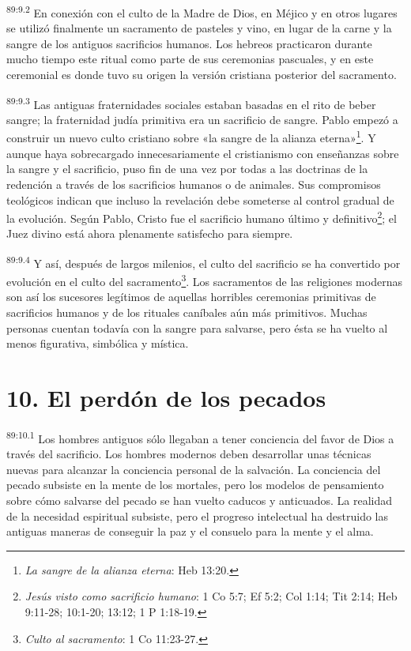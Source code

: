 \par
\textsuperscript{89:9.2} En conexión con el culto de la Madre de Dios, en Méjico y en otros lugares se utilizó finalmente un sacramento de pasteles y vino, en lugar de la carne y la sangre de los antiguos sacrificios humanos. Los hebreos practicaron durante mucho tiempo este ritual como parte de sus ceremonias pascuales, y en este ceremonial es donde tuvo su origen la versión cristiana posterior del sacramento.

\par
\textsuperscript{89:9.3} Las antiguas fraternidades sociales estaban basadas en el rito de beber sangre; la fraternidad judía primitiva era un sacrificio de sangre. Pablo empezó a construir un nuevo culto cristiano sobre «la sangre de la alianza eterna»\footnote{\textit{La sangre de la alianza eterna}: Heb 13:20.}. Y aunque haya sobrecargado innecesariamente el cristianismo con enseñanzas sobre la sangre y el sacrificio, puso fin de una vez por todas a las doctrinas de la redención a través de los sacrificios humanos o de animales. Sus compromisos teológicos indican que incluso la revelación debe someterse al control gradual de la evolución. Según Pablo, Cristo fue el sacrificio humano último y definitivo\footnote{\textit{Jesús visto como sacrificio humano}: 1 Co 5:7; Ef 5:2; Col 1:14; Tit 2:14; Heb 9:11-28; 10:1-20; 13:12; 1 P 1:18-19.}; el Juez divino está ahora plenamente satisfecho para siempre.

\par
\textsuperscript{89:9.4} Y así, después de largos milenios, el culto del sacrificio se ha convertido por evolución en el culto del sacramento\footnote{\textit{Culto al sacramento}: 1 Co 11:23-27.}. Los sacramentos de las religiones modernas son así los sucesores legítimos de aquellas horribles ceremonias primitivas de sacrificios humanos y de los rituales caníbales aún más primitivos. Muchas personas cuentan todavía con la sangre para salvarse, pero ésta se ha vuelto al menos figurativa, simbólica y mística.

\section*{10. El perdón de los pecados}
\par
\textsuperscript{89:10.1} Los hombres antiguos sólo llegaban a tener conciencia del favor de Dios a través del sacrificio. Los hombres modernos deben desarrollar unas técnicas nuevas para alcanzar la conciencia personal de la salvación. La conciencia del pecado subsiste en la mente de los mortales, pero los modelos de pensamiento sobre cómo salvarse del pecado se han vuelto caducos y anticuados. La realidad de la necesidad espiritual subsiste, pero el progreso intelectual ha destruido las antiguas maneras de conseguir la paz y el consuelo para la mente y el alma.

